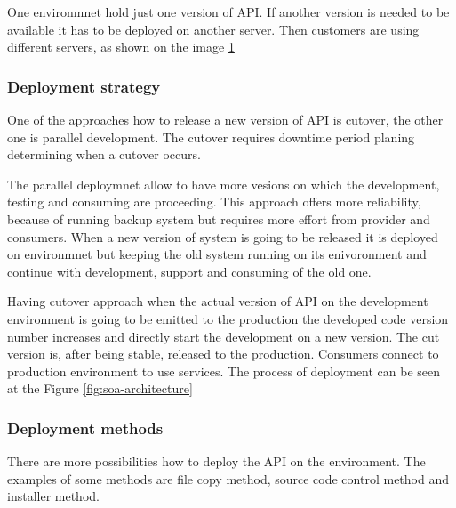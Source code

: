 One environmnet hold just one version of API. If another version is needed to be available it has to be deployed on another server. Then customers are using different servers, as shown on the image \ref{fig:consumer-server}

\begin{figure}[htp] 
\caption{}
\label{fig:consumer-server}
\end{figure} 

\subsubsection{Deployment strategy}
One of the approaches how to release a new version of API is cutover, the other one is parallel development. The cutover requires downtime period planing determining when a cutover occurs. 

The parallel deploymnet allow to have more vesions on which the development, testing and consuming are proceeding. This approach offers more reliability, because of running backup system but requires more effort from provider and consumers. When a new version of system is going to be released it is deployed on environmnet but keeping the old system running on its enivoronment and continue with development, support and consuming of the old one. 

Having cutover approach when the actual version of API on the development environment is going to be emitted to the production the developed code version number increases and directly start the development on a new version. The cut version is, after being stable, released to the production. Consumers connect to production environment to use services. The process of deployment can be seen at the Figure \ref{fig:soa-architecture}


\subsubsection{Deployment methods}
There are more possibilities how to deploy the API on the environment. The examples of some methods are file copy method, source code control method and installer method. 


